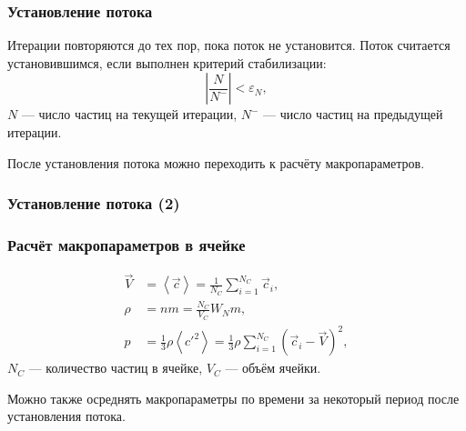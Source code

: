 \documentclass[onlymath]{beamer}
\newcommand{\abs}[1]{\left \lvert{#1}\right \rvert}
\newcommand\avg[1]{\left\langle{#1}\right\rangle}
\renewcommand\epsilon\varepsilon
\newcommand{\statw}{W_N}
\begin{document}
\begin{frame}
  \frametitle{Установление потока}
  Итерации повторяются до тех пор, пока поток не установится.
  Поток считается установившимся, если выполнен критерий
    стабилизации:
    \begin{equation*}
      \abs{\frac{N}{N^-}} < \epsilon_N,
    \end{equation*}
    $N$ — число частиц на текущей итерации, $N^-$ — число частиц на
    предыдущей итерации.

    После установления потока можно переходить к расчёту
    макропараметров.
\end{frame}

\begin{frame}
  \frametitle{Установление потока (2)}
  \begin{figure}[!h]
  \end{figure}
\end{frame}

\begin{frame}
  \frametitle{Расчёт макропараметров в ячейке}
  \begin{equation*}
    \begin{aligned}
        \vec{V} &= \avg{\vec{c}} = 
        \frac{1}{N_C}\sum_{i = 1}^{N_C}{\vec{c}_i},\\
        \rho &= nm = \frac{N_C}{V_C}\statw m,\\
        p &= \frac{1}{3}\rho\avg{c'^2} = 
        \frac{1}{3}\rho\sum_{i=1}^{N_C}(\vec{c}_i - \vec{V})^2,
      \end{aligned}
    \end{equation*}
    $N_C$ — количество частиц в ячейке, $V_C$ — объём ячейки.

    Можно также осреднять макропараметры по времени за некоторый
    период после установления потока.
\end{frame}
\end{document}
